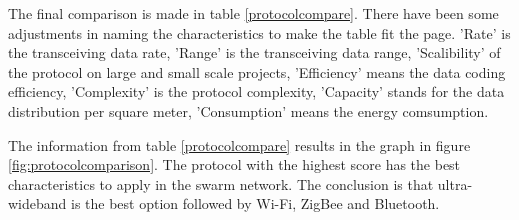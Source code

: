 \documentclass[10pt,a4paper]{article}
\begin{document}
The final comparison is made in table \ref{protocolcompare}. There have been some adjustments in naming the characteristics to make the table fit the page. 'Rate' is the transceiving data rate, 'Range' is the transceiving data range, 'Scalibility' of the protocol on large and small scale projects, 'Efficiency' means the data coding efficiency, 'Complexity' is the protocol complexity, 'Capacity' stands for the data distribution per square meter, 'Consumption' means the energy comsumption.
\begin{table}[H]
\centering
\caption{The comparison of the protocols. The characteristics of each of the protocols get evaluated. The scoring is based on a number between zero and one, where zero is bad and one is good. The total score gives the best protocol for this situation.}
\label{protocolcompare}
\end{table}

The information from table \ref{protocolcompare} results in the graph in figure \ref{fig:protocolcomparison}. The protocol with the highest score has the best characteristics to apply in the swarm network. The conclusion is that ultra-wideband is the best option followed by Wi-Fi, ZigBee and Bluetooth.
\end{document}
